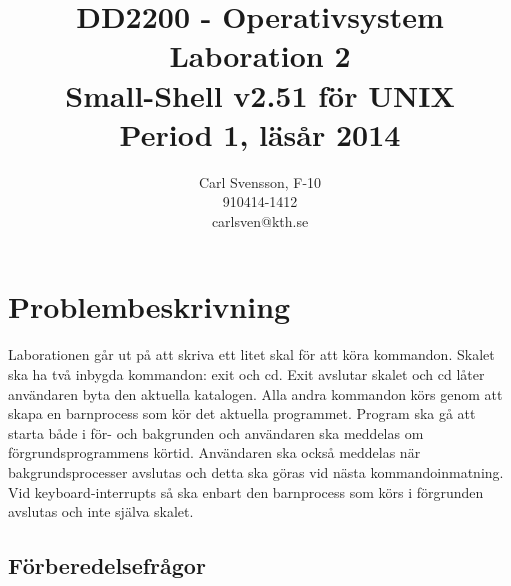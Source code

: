 \documentclass[10pt,a4paper]{article}
\title{DD2200 - Operativsystem \\ Laboration 2 \\ Small-Shell v2.51 för UNIX \\ Period 1, läsår 2014}
\author{Carl Svensson, F-10 \\ 910414-1412 \\ carlsven@kth.se}
\date{}
\begin{document}
\maketitle
\tableofcontents
\clearpage

\section{Problembeskrivning}

Laborationen går ut på att skriva ett litet skal för att köra kommandon. Skalet ska ha två inbygda kommandon: exit och cd. Exit avslutar skalet och cd låter användaren byta den aktuella katalogen. Alla andra kommandon körs genom att skapa en barnprocess som kör det aktuella programmet. Program ska gå att starta både i för- och bakgrunden och användaren ska meddelas om förgrundsprogrammens körtid. Användaren ska också meddelas när bakgrundsprocesser avslutas och detta ska göras vid nästa kommandoinmatning. Vid keyboard-interrupts så ska enbart den barnprocess som körs i förgrunden avslutas och inte själva skalet.

\subsection{Förberedelsefrågor}
\end{document}
